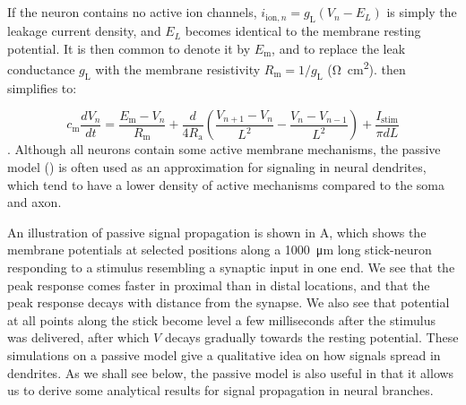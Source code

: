 \subsection{}
\label{sec:Neuron:Passive_multicomp}
If the neuron contains no active ion channels, $i_{\mathrm{ion},n} = g_\text{L}(V_n - E_L)$ is simply the leakage current density, and $E_L$ becomes identical to the membrane resting potential. It is then common to denote it by $E_\text{m}$, and to replace the leak conductance $g_\text{L}$ with the membrane resistivity $R_\text{m} = 1/g_\text{L}$ (\si{\ohm\square\centi\metre}).  then simplifies to:

\begin{equation}
c_\text{m} \frac{dV_n}{dt} = \frac{E_\text{m}-V_n}{R_\text{m}} + \frac{d}{4R_\text{a}}\left(\frac{V_{n+1}-V_n}{L^2} - \frac{V_n-V_{n-1}}{L^2} \right) + \frac{I_\text{stim}}{\pi d L}
\label{eq:Neuron:multipassive}
\end{equation}
.
Although all neurons contain some active membrane mechanisms, the passive model () is often used as an approximation for signaling in neural dendrites, which tend to have a lower density of active mechanisms compared to the soma and axon. 

An illustration of passive signal propagation is shown in A, which shows the membrane potentials at selected positions along a 1000~\si{\micro\metre} long stick-neuron responding to a stimulus resembling a synaptic input in one end. We see that the peak response comes faster in proximal than in distal locations, and that the peak response decays with distance from the synapse. We also see that potential at all points along the stick become level a few milliseconds after the stimulus was delivered, after which $V$ decays gradually towards the resting potential. These simulations on a passive model give a qualitative idea on how signals spread in dendrites. As we shall see below, the passive model is also useful in that it allows us to derive some analytical results for signal propagation in neural branches.

